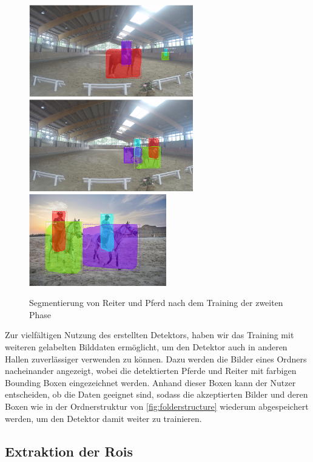\begin{figure}
\centering
\includegraphics[height=4cm,trim={12cm 0 3cm 0},clip]{./img/IndoorMaske.png}
\includegraphics[height=4cm,trim={15cm 0 0 0},clip]{./img/IndoorMaske2.png}
\includegraphics[height=4cm,trim={1cm 0 3cm 0},clip]{./img/OutdoorMaske.png}
\caption{Segmentierung von Reiter und Pferd nach dem Training der zweiten Phase}
\label{fig:SegmentierungPhase2}
\end{figure}

Zur vielfältigen Nutzung des erstellten Detektors, haben wir das Training mit weiteren gelabelten Bilddaten ermöglicht, um den Detektor auch in anderen Hallen zuverlässiger verwenden zu können. Dazu werden die Bilder eines Ordners nacheinander angezeigt, wobei die detektierten Pferde und Reiter mit farbigen Bounding Boxen eingezeichnet werden. Anhand dieser Boxen kann der Nutzer entscheiden, ob die Daten geeignet sind, sodass die akzeptierten Bilder und deren Boxen wie in der Ordnerstruktur von \ref{fig:folderstructure} wiederum abgespeichert werden, um den Detektor damit weiter zu trainieren.

\subsection*{Extraktion der Rois}

